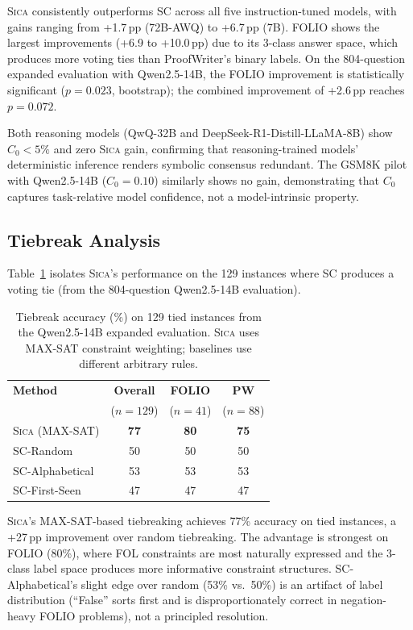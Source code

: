 \documentclass[11pt,a4paper]{article}
\newcommand{\sica}{\textsc{Sica}}
\newcommand{\czero}{C_0}
\begin{document}
\sica{} consistently outperforms SC across all five instruction-tuned models, with gains ranging from +1.7\,pp (72B-AWQ) to +6.7\,pp (7B).
FOLIO shows the largest improvements (+6.9 to +10.0\,pp) due to its 3-class answer space, which produces more voting ties than ProofWriter's binary labels.
On the 804-question expanded evaluation with Qwen2.5-14B, the FOLIO improvement is statistically significant ($p{=}0.023$, bootstrap); the combined improvement of +2.6\,pp reaches $p{=}0.072$.

Both reasoning models (QwQ-32B and DeepSeek-R1-Distill-LLaMA-8B) show $\czero{}<5\%$ and zero \sica{} gain, confirming that reasoning-trained models' deterministic inference renders symbolic consensus redundant.
The GSM8K pilot with Qwen2.5-14B ($\czero{}{=}0.10$) similarly shows no gain, demonstrating that $\czero{}$ captures task-relative model confidence, not a model-intrinsic property.


\subsection{Tiebreak Analysis}
\label{sec:tiebreak}

Table~\ref{tab:tiebreak} isolates \sica{}'s performance on the 129 instances where SC produces a voting tie (from the 804-question Qwen2.5-14B evaluation).

\begin{table}[t]
\centering
\caption{Tiebreak accuracy (\%) on 129 tied instances from the Qwen2.5-14B expanded evaluation. \sica{} uses MAX-SAT constraint weighting; baselines use different arbitrary rules.}
\label{tab:tiebreak}
\small
\begin{tabular}{@{}l ccc@{}}
\toprule
\textbf{Method} & \textbf{Overall} & \textbf{FOLIO} & \textbf{PW} \\
& ($n{=}129$) & ($n{=}41$) & ($n{=}88$) \\
\midrule
\sica{} (MAX-SAT)   & \textbf{77} & \textbf{80} & \textbf{75} \\
SC-Random            & 50 & 50 & 50 \\
SC-Alphabetical      & 53 & 53 & 53 \\
SC-First-Seen        & 47 & 47 & 47 \\
\bottomrule
\end{tabular}
\end{table}

\sica{}'s MAX-SAT-based tiebreaking achieves 77\% accuracy on tied instances, a +27\,pp improvement over random tiebreaking.
The advantage is strongest on FOLIO (80\%), where FOL constraints are most naturally expressed and the 3-class label space produces more informative constraint structures.
SC-Alphabetical's slight edge over random (53\% vs.\ 50\%) is an artifact of label distribution (``False'' sorts first and is disproportionately correct in negation-heavy FOLIO problems), not a principled resolution.
\end{document}
